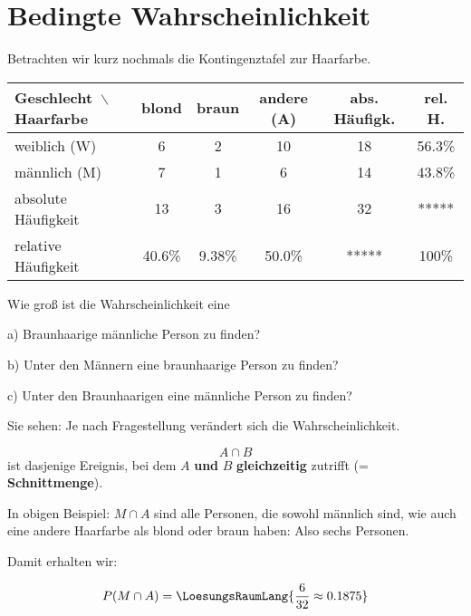 
\section{Bedingte Wahrscheinlichkeit}

Betrachten wir kurz nochmals die Kontingenztafel zur Haarfarbe.


\begin{tabular}{l|c|c|c|c|c}
Geschlecht\, $\backslash$ Haarfarbe  &  blond   & braun   & andere  (A) & abs. Häufigk.    & rel. H. \\ \hline
weiblich (W)                         &  6       & 2       & 10          &       18         & 56.3\%\\ \hline 
männlich (M)                         &  7       & 1       &  6          &       14 & 43.8\%\\ \hline
absolute Häufigkeit                  & 13       & 3       & 16          &       32 &  *****          \\ \hline
relative Häufigkeit                  & 40.6\%   & 9.38\%  & 50.0\%      &   *****  &  100\%          \\ \hline
\end{tabular}

Wie groß ist die Wahrscheinlichkeit eine

a) Braunhaarige männliche Person zu finden? 

b) Unter den Männern eine braunhaarige Person zu finden? 

c) Unter den Braunhaarigen eine männliche Person zu finden? 

Sie sehen: Je nach Fragestellung verändert sich die Wahrscheinlichkeit.


\begin{definition}{}{}
$$A\cap B$$ ist dasjenige Ereignis, bei dem $A$ \textbf{und} $B$
\textbf{gleichzeitig} zutrifft (= \textbf{Schnittmenge}).
\end{definition}

In obigen Beispiel: $M \cap A$ sind alle Personen, die sowohl
männlich sind, wie auch eine andere Haarfarbe als blond oder braun
haben: Also sechs Personen.

Damit erhalten wir:

$$P(M\cap A) = \LoesungsRaumLang{\frac{6}{32} \approx 0.1875}$$

